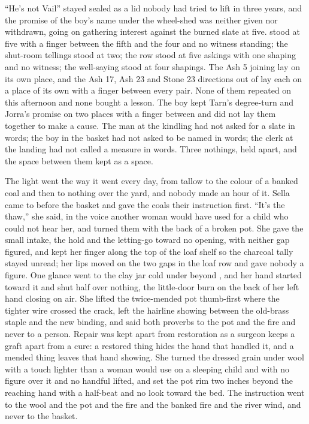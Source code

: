 “He's not Vail” stayed sealed as a lid nobody had tried to lift in three years, and the promise of the boy's name under the wheel-shed was neither given nor withdrawn, going on gathering interest against the burned slate at five.  stood at five with a finger between the fifth and the four and no witness standing; the shut-room tellings stood at two; the row stood at five askings with one shaping and no witness; the well-saying stood at four shapings. The Ash 5 joining lay on its own place, and the Ash 17, Ash 23 and Stone 23 directions out of  lay each on a place of its own with a finger between every pair. None of them repeated on this afternoon and none bought a lesson. The boy kept Tarn's degree-turn and Jorra's promise on two places with a finger between and did not lay them together to make a cause. The man at the kindling had not asked for a slate in words; the boy in the basket had not asked to be named in words; the clerk at the landing had not called a measure in words. Three nothings, held apart, and the space between them kept as a space.

\scenebreak

The light went the way it went every day, from tallow to the colour of a banked coal and then to nothing over the yard, and nobody made an hour of it. Sella came to  before the basket and gave the coals their instruction first. “It's the thaw,” she said, in the voice another woman would have used for a child who could not hear her, and turned them with the back of a broken pot. She gave the small intake, the hold and the letting-go toward no opening, with neither gap figured, and kept her finger along the top of the loaf shelf so the charcoal tally stayed unread; her lips moved on the two gaps in the loaf row and gave nobody a figure. One glance went to the clay jar cold under  beyond , and her hand started toward it and shut half over nothing, the little-door burn on the back of her left hand closing on air. She lifted the twice-mended pot thumb-first where the tighter wire crossed the crack, left the hairline showing between the old-brass staple and the new binding, and said both proverbs to the pot and the fire and never to a person. Repair was kept apart from restoration as a surgeon keeps a graft apart from a cure: a restored thing hides the hand that handled it, and a mended thing leaves that hand showing. She turned the dressed grain under wool with a touch lighter than a woman would use on a sleeping child and with no figure over it and no handful lifted, and set the pot rim two inches beyond the reaching hand with a half-beat and no look toward the bed. The instruction went to the wool and the pot and the fire and the banked fire and the river wind, and never to the basket.

